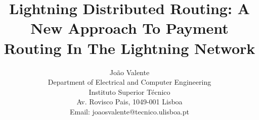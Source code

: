 \documentclass[conference,compsoc]{IEEEtran}
\begin{document}
%
\title{Lightning Distributed Routing: A New Approach To Payment Routing In The Lightning Network}


\author{João Valente\\
Department of Electrical and Computer Engineering\\
Instituto Superior Técnico\\
Av. Rovisco Pais, 1049-001 Lisboa\\
Email: joaosvalente@tecnico.ulisboa.pt}

\maketitle





\end{document}
